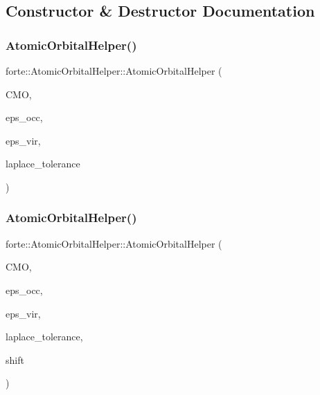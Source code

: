 \subsection{Constructor \& Destructor Documentation}
\mbox{\label{classforte_1_1_atomic_orbital_helper_a14a54771aec07f989de0504907007923}} 
\subsubsection{\texorpdfstring{Atomic\+Orbital\+Helper()}{AtomicOrbitalHelper()}\hspace{0.1cm}{\footnotesize\ttfamily [1/2]}}
{\footnotesize\ttfamily forte\+::\+Atomic\+Orbital\+Helper\+::\+Atomic\+Orbital\+Helper (\begin{DoxyParamCaption}\item[{psi\+::\+Shared\+Matrix}]{C\+MO,  }\item[{psi\+::\+Shared\+Vector}]{eps\+\_\+occ,  }\item[{psi\+::\+Shared\+Vector}]{eps\+\_\+vir,  }\item[{double}]{laplace\+\_\+tolerance }\end{DoxyParamCaption})}

\mbox{\label{classforte_1_1_atomic_orbital_helper_ad22eb22a692b1d690bbfe0acc629c1c4}} 
\subsubsection{\texorpdfstring{Atomic\+Orbital\+Helper()}{AtomicOrbitalHelper()}\hspace{0.1cm}{\footnotesize\ttfamily [2/2]}}
{\footnotesize\ttfamily forte\+::\+Atomic\+Orbital\+Helper\+::\+Atomic\+Orbital\+Helper (\begin{DoxyParamCaption}\item[{psi\+::\+Shared\+Matrix}]{C\+MO,  }\item[{psi\+::\+Shared\+Vector}]{eps\+\_\+occ,  }\item[{psi\+::\+Shared\+Vector}]{eps\+\_\+vir,  }\item[{double}]{laplace\+\_\+tolerance,  }\item[{int}]{shift }\end{DoxyParamCaption})}

